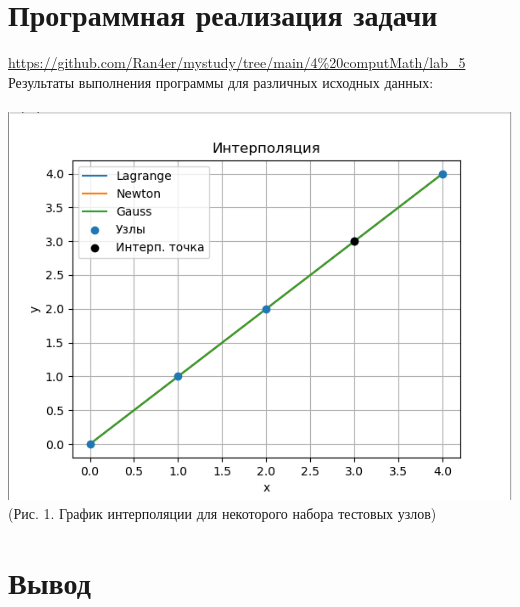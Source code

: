 \documentclass[12pt]{article}
\begin{document}
\section{Программная реализация задачи}
\vspace{5mm}
\url{https://github.com/Ran4er/mystudy/tree/main/4%20computMath/lab_5}\\
\vspace{5mm}
Результаты выполнения программы для различных исходных данных:\\
\\
\vspace{5mm}
\centering
\includegraphics[scale=0.7]{interpolation_pict.png}\\
(Рис. 1. График интерполяции для некоторого набора тестовых узлов)\\
\raggedright

\section*{Вывод}
\end{document}
